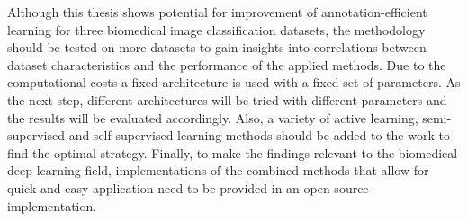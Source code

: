 Although this thesis shows potential for improvement of annotation-efficient learning for three biomedical image classification datasets, the methodology should be tested on more datasets to gain insights into correlations between dataset characteristics and the performance of the applied methods. Due to the computational costs a fixed architecture is used with a fixed set of parameters. As the next step, different architectures will be tried with different parameters and the results will be evaluated accordingly. Also, a variety of active learning, semi-supervised and self-supervised learning methods should be added to the work to find the optimal strategy. Finally, to make the findings relevant to the biomedical deep learning field, implementations of the combined methods that allow for quick and easy application need to be provided in an open source implementation.

